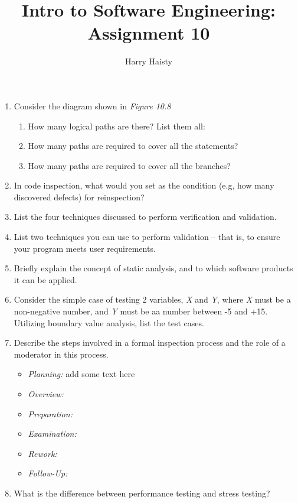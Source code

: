 \documentclass[11pt]{article}
\title{Intro to Software Engineering: Assignment 10}
\author{Harry Haisty}
\begin{document}
    \maketitle
    \begin{enumerate}
        \item Consider the diagram shown in \textit{Figure 10.8}
        \begin{enumerate}
        \item How many logical paths are there? List them all:
        
        \item How many paths are required to cover all the statements?
        
        \item How many paths are required to cover all the branches?
        \end{enumerate}
        
        \item In code inspection, what would you set as the condition (e.g, how many discovered defects) for reinspection?
        
        \item List the four techniques discussed to perform verification and validation.
        
        \item List two techniques you can use to perform validation -- that is, to ensure your program meets user requirements. 
        
        \item Briefly explain the concept of static analysis, and to which software products it can be applied.
        
        \item Consider the simple case of testing 2 variables, \textit{X} and \textit{Y}, where \textit{X} must be a non-negative number, and \textit{Y} must be aa number between -5 and +15. Utilizing boundary value analysis, list the test cases. 
        
        \item Describe the steps involved in a formal inspection process and the role of a moderator in this process.
        \begin{itemize}
        \item \textit{Planning: } add some text here
        \item \textit{Overview: }
        \item \textit{Preparation: } 
        \item \textit{Examination: } 
        \item \textit{Rework: }
        \item \textit{Follow-Up: } 
        \end{itemize}
        
        \item What is the difference between performance testing and stress testing? 
        
        
    \end{enumerate}
    
    
\end{document}
